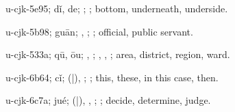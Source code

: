\begin{multicols}{2}
{\cjkgGlue{}u-cjk-5e95; dǐ, de; \cjkgGlue{}; \cjkgGlue{}; bottom, underneath, underside.

\cjkgGlue{}u-cjk-5b98; guān; \cjkgGlue{}, \cjkgGlue{}; \cjkgGlue{}; official, public servant.

\cjkgGlue{}u-cjk-533a; qū, ōu; \cjkgGlue{}, \cjkgGlue{}; \cjkgGlue{}, \cjkgGlue{}, \cjkgGlue{}; area, district, region, ward.

\cjkgGlue{}u-cjk-6b64; cǐ; \cjkgGlue{}\cjkgGlue{}(\cjkgGlue{}|\cjkgGlue{}), \cjkgGlue{}; \cjkgGlue{}; this, these, in this case, then.

\cjkgGlue{}u-cjk-6c7a; jué; \cjkgGlue{}\cjkgGlue{}(\cjkgGlue{}|\cjkgGlue{}), \cjkgGlue{}\cjkgGlue{}\cjkgGlue{}, \cjkgGlue{}\cjkgGlue{}\cjkgGlue{}; \cjkgGlue{}; decide, determine, judge.

}
\end{multicols}
